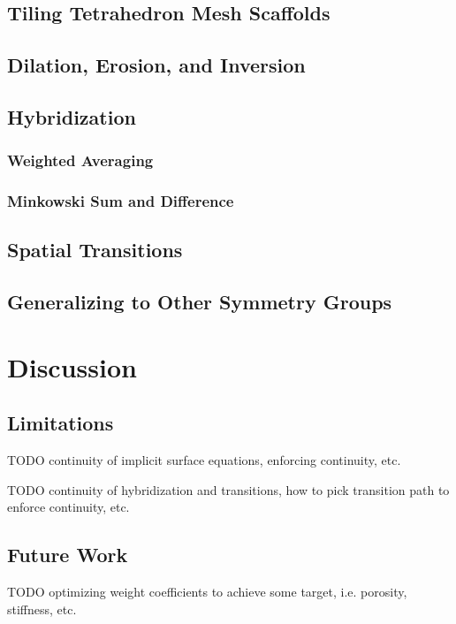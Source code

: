 \documentclass[acmtog]{acmart}
\begin{document}
\subsection{Tiling Tetrahedron Mesh Scaffolds}

\subsection{Dilation, Erosion, and Inversion}
\label{sec:dilation_erosion_inversion}

\subsection{Hybridization}

\subsubsection{Weighted Averaging}

\subsubsection{Minkowski Sum and Difference}

\subsection{Spatial Transitions}

\subsection{Generalizing to Other Symmetry Groups}

\section{Discussion}
\subsection{Limitations}
TODO continuity of implicit surface equations, enforcing continuity, etc.

TODO continuity of hybridization and transitions, how to pick transition path to enforce continuity, etc.

\subsection{Future Work}
TODO optimizing weight coefficients to achieve some target, i.e. porosity, stiffness, etc.
\end{document}
